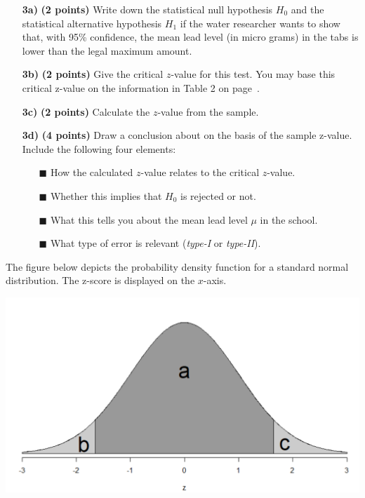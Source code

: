 \begin{itemize}


    \item[\textbf{3a)}] \textbf{(2 points)} Write down the statistical null hypothesis $H_0$ and the statistical alternative hypothesis $H_1$ if the water researcher wants to show that, with 95\% confidence, the mean lead level (in micro grams) in the tabs is lower than the legal maximum amount.
    
    \item[\textbf{3b)}] \textbf{(2 points)} Give the critical $z$-value for this test. You may base this critical z-value on the information in Table 2 on page~\pageref{table2}.

    \item[\textbf{3c)}] \textbf{(2 points)} Calculate the $z$-value from the sample.
    
    \item[\textbf{3d)}] \textbf{(4 points)} Draw a conclusion about  on the basis of the sample z-value. Include the following four elements: 
    \begin{itemize}
        \item[$\blacksquare$] How the calculated $z$-value relates to the critical $z$-value.
        \item[$\blacksquare$] Whether this implies that $H_0$ is rejected or not.
        \item[$\blacksquare$] What this tells you about the mean lead level $\mu$ in the school.
        \item[$\blacksquare$] What type of error is relevant (\textit{type-I} or \textit{type-II}).
    \end{itemize}

\end{itemize}
    
    The figure below depicts the probability density function for a standard normal distribution. The z-score is displayed on the $x$-axis. \\
    \begin{center}
        \includegraphics[width=.8\textwidth]{Files/Images/normalDistExam.png}
    \end{center}
    
